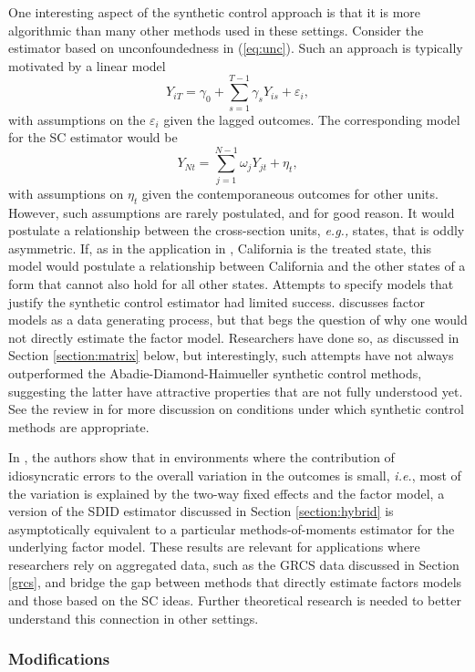 \documentclass[letterpaper,12pt,leqno]{article}
\begin{document}
One interesting aspect of the synthetic control approach is that it is more algorithmic than many other methods used in these settings. Consider the estimator based on unconfoundedness in (\ref{eq:unc}). Such an approach is typically motivated by a linear model
\[ Y_{iT}=\gamma_0+\sum_{s=1}^{T-1} \gamma_s Y_{is}+\varepsilon_{i},\]
with assumptions on the $\varepsilon_i$ given the lagged outcomes. The corresponding model for the SC estimator would be
\[ Y_{Nt}=\sum_{j=1}^{N-1} \omega_j Y_{jt}+\eta_{t},\]
with assumptions on $\eta_t$ given the contemporaneous outcomes for other units. However, such assumptions are rarely postulated, and for good reason. It would postulate a relationship between the cross-section units, {\it e.g.,} states, that is oddly asymmetric. If, as in the application in 
\citep*{abadie2010synthetic}, California is the treated state, this model would postulate a relationship between California and the other states of a form that cannot also hold for all other states. Attempts to specify models that justify the synthetic control estimator had limited success. 
\citep*{abadie2010synthetic} discusses factor models as a data generating process, but that begs the question of why one would not directly estimate the factor model.
Researchers have done so, as discussed in Section \ref{section:matrix} below, but interestingly, such attempts have not always outperformed the Abadie-Diamond-Haimueller synthetic control methods, suggesting the latter have attractive properties that are not fully understood yet. See the review in \citep{abadie2019using} for more discussion on conditions under which synthetic control methods are appropriate.

In \cite{arkhangelsky2024sequential}, the authors show that in environments where the contribution of idiosyncratic errors to the overall variation in the outcomes is small, {\it i.e.}, most of the variation is explained by the two-way fixed effects and the factor model, a version of the SDID estimator discussed in Section \ref{section:hybrid} is asymptotically equivalent to a particular methods-of-moments estimator for the underlying factor model.  These results are relevant for applications where researchers rely on aggregated data, such as the GRCS data discussed in Section \ref{grcs}, and bridge the gap between methods that directly estimate factors models and those based on the SC ideas. Further theoretical research is needed to better understand this connection in other settings. 


\subsubsection{Modifications}
\end{document}
